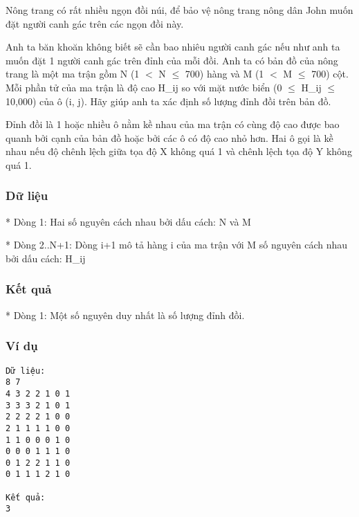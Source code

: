 



   Nông trang có rất nhiều ngọn đồi núi, để bảo vệ nông trang nông dân John muốn đặt người canh gác trên các ngọn đồi này.  

   Anh ta băn khoăn không biết sẽ cần bao nhiêu người canh gác nếu như anh ta muốn đặt 1 người canh gác trên đỉnh của mỗi đồi. Anh ta có bản đồ của nông trang là một ma trận gồm N (1 $<$ N  $\le$  700) hàng và M (1 $<$ M  $\le$  700) cột. Mỗi phần tử của ma trận là độ cao H\_ij so với mặt nước biển (0  $\le$  H\_ij  $\le$  10,000) của ô (i, j). Hãy giúp anh ta xác định số lượng đỉnh đồi trên bản đồ.  

   Đỉnh đồi là 1 hoặc nhiều ô nằm kề nhau của ma trận có cùng độ cao được bao quanh bởi cạnh của bản đồ hoặc bởi các ô có độ cao nhỏ hơn. Hai ô gọi là kề nhau nếu độ chênh lệch giữa tọa độ X không quá 1 và chênh lệch tọa độ Y không quá 1.  

\subsubsection{   Dữ liệu  }

   * Dòng 1: Hai số nguyên cách nhau bởi dấu cách: N và M  

   * Dòng 2..N+1: Dòng i+1 mô tả hàng i của ma trận với M số nguyên cách nhau bởi dấu cách: H\_ij  

\subsubsection{   Kết quả  }

   * Dòng 1: Một số nguyên duy nhất là số lượng đỉnh đồi.  

\subsubsection{   Ví dụ  }
\begin{verbatim}
Dữ liệu:
8 7
4 3 2 2 1 0 1
3 3 3 2 1 0 1
2 2 2 2 1 0 0
2 1 1 1 1 0 0
1 1 0 0 0 1 0
0 0 0 1 1 1 0
0 1 2 2 1 1 0
0 1 1 1 2 1 0

Kết quả:
3
\end{verbatim}

